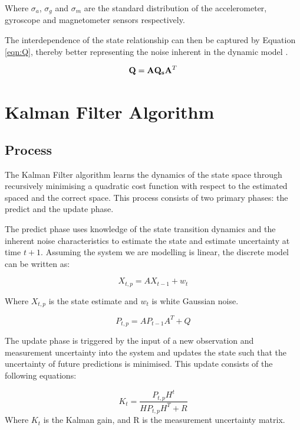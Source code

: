 \documentclass[12pt]{article}
\begin{document}
Where $\sigma_{a}$, $\sigma_{g}$ and $\sigma_{m}$ are the standard distribution of the accelerometer, gyroscope and magnetometer sensors respectively.

The interdependence of the state relationship can then be captured by Equation \ref{eqn:Q}, thereby better representing the noise inherent in the dynamic model \cite{kalmanfilternet}.

\begin{equation} \label{eqn:Q}
    \bold{Q} = \bold{A}\bold{Q_s}\bold{A}^T
\end{equation}


\section{Kalman Filter Algorithm}
\subsection{Process}
The Kalman Filter algorithm learns the dynamics of the state space through recursively minimising a quadratic cost function with respect to the estimated spaced and the correct space. This process consists of two primary phases: the predict and the update phase.

The predict phase uses knowledge of the state transition dynamics and the inherent noise characteristics to estimate the state and estimate uncertainty at time $t + 1$. Assuming the system we are modelling is linear, the discrete model can be written as:

\begin{equation}
    X_{t, p} = AX_{t-1} + w_{t}
\end{equation}

Where $X_{t, p}$ is the state estimate and $w_{t}$ is white Gaussian noise. 

\begin{equation}
    P_{t, p} = AP_{t-1}A^T + Q
\end{equation}

The update phase is triggered by the input of a new observation and measurement uncertainty into the system and updates the state such that the uncertainty of future predictions is minimised. This update consists of the following equations:

\begin{equation}
    K_t = \frac{P_{t, p}H^t}{HP_{t, p}H^T + R}
\end{equation}
Where $K_t$ is the Kalman gain, and R is the measurement uncertainty matrix.
\end{document}
